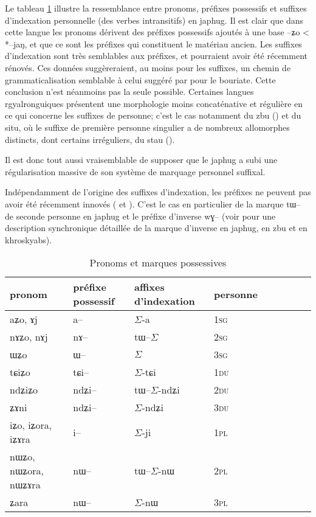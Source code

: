 \documentclass[oldfontcommands,oneside,a4paper,11pt]{article}
\newcommand{\ipa}[1]{{\phon \mbox{#1}}} %
\newcommand{\ro}{$\Sigma$}
\begin{document}
Le tableau \ref{tab:pronoms} illustre la ressemblance entre pronoms, préfixes possessifs et suffixes d'indexation personnelle (des verbes intransitifs) en japhug. Il est clair que dans cette langue les pronoms dérivent des préfixes possessifs ajoutés à une base \ipa{--ʑo} < *\ipa{--jaŋ}, et que ce sont les préfixes qui constituent le matériau ancien. Les suffixes d'indexation sont très semblables aux préfixes, et pourraient avoir été récemment rénovés. Ces données suggèreraient, au moins pour les suffixes, un chemin de grammaticalisation semblable à celui  suggéré par \citealt{comrie80morpho} pour le bouriate. Cette conclusion n'est néanmoins pas la seule possible. Certaines langues rgyalronguiques présentent une morphologie moins concaténative et régulière en ce qui concerne les suffixes de personne; c'est le cas notamment du zbu (\citealt{gongxun14agreement}) et du situ, où le suffixe de première personne singulier a de nombreux allomorphes distincts, dont certains irréguliers, du stau (\citealt{jacques14rtau}). 

Il est donc tout aussi vraisemblable de supposer que le japhug a subi une régularisation massive de son système de marquage personnel suffixal.
   
   Indépendamment de l'origine des suffixes d'indexation,  les préfixes ne peuvent pas avoir été récemment innovés (\citealt{jacques12agreement} et \citealt{delancey14second}). C'est le cas en particulier de la marque \ipa{tɯ--} de seconde personne en japhug et le préfixe d'inverse \ipa{wɣ--} (voir \citealt{jacques10inverse, gongxun14agreement, lai14person} pour une description synchronique détaillée de la marque d'inverse en japhug, en zbu et en khroskyabs).
   
\begin{table}[H] \centering
\caption{Pronoms et marques possessives }\label{tab:pronoms}
\begin{tabular}{lllllllll} 
\toprule
pronom & préfixe possessif & affixes d'indexation& personne \\
\midrule
 \ipa{aʑo},    \ipa{ɤj} &	\ipa{a--}  &	\ro{}-\ipa{a}	& 1\textsc{sg} \\
\ipa{nɤʑo},  \ipa{nɤj} &	\ipa{nɤ--}  &	\ipa{tɯ--}\ro{} &		2\textsc{sg}\\
\ipa{ɯʑo}  &	\ipa{ɯ--}  &	\ro{} 	&	3\textsc{sg}\\
\midrule
\ipa{tɕiʑo}  &	\ipa{tɕi--}  &			\ro{}-\ipa{tɕi}	&	1\textsc{du} \\
\ipa{ndʑiʑo}  &	\ipa{ndʑi--}  &		\ipa{tɯ--}\ro{}-\ipa{ndʑi} &		2\textsc{du} \\	
\ipa{ʑɤni}  &	\ipa{ndʑi--}  &	\ro{}-\ipa{ndʑi} &		3\textsc{du} \\	
\midrule
\ipa{iʑo}, \ipa{iʑora},   \ipa{iʑɤra}   &	\ipa{i--}  &	\ro{}-\ipa{ji}	&		1\textsc{pl} \\
\ipa{nɯʑo}, \ipa{nɯʑora},   \ipa{nɯʑɤra}  &	\ipa{nɯ--}  &	\ipa{tɯ--}\ro{}-\ipa{nɯ} &			2\textsc{pl} \\
\ipa{ʑara}  &	\ipa{nɯ--}  &			\ro{}-\ipa{nɯ} &3\textsc{pl} \\
\bottomrule
\end{tabular}
\end{table}
\end{document}
